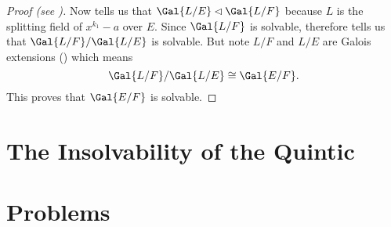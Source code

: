 \begin{proof}[Proof (see {\cite[Theorem 32.5]{gallian_2016}})]
    Now  tells us that $\Gal{L/E} \lhd \Gal{L/F}$ because $L$ is the splitting field of $x^{k_1} - a$ over $E$. Since $\Gal{L/F}$ is solvable, therefore  tells us that $\Gal{L/F}/\Gal{L/E}$ is solvable. But note $L/F$ and $L/E$ are Galois extensions () which means
    \[
        \Gal{L/F}/\Gal{L/E} \cong \Gal{E/F}.
    \]
    This proves that $\Gal{E/F}$ is solvable.
\end{proof}


\section{The Insolvability of the Quintic}

\newpage

\section{Problems}

